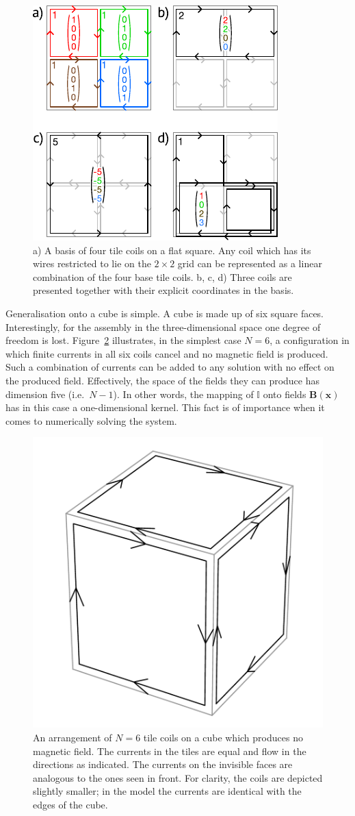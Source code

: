 \begin{figure}
  \centering
  \includegraphics[width=0.6\linewidth]{gfx/coils/tile_basis.pdf}
  \caption{a) A basis of four tile coils on a flat square. Any coil which has its wires restricted to lie on the $2 \times 2$ grid can be represented as a linear combination of the four base tile coils. b, c, d) Three coils are presented together with their explicit coordinates in the basis.}\label{fig:coils_tile_basis}
\end{figure}

Generalisation onto a cube is simple. A cube is made up of six square faces. Interestingly, for the assembly in the three-dimensional space one degree of freedom is lost.  Figure~\ref{fig:coils_tile_kernel} illustrates, in the simplest case $N = 6$, a configuration in which finite currents in all six coils cancel and no magnetic field is produced. Such a combination of currents can be added to any solution with no effect on the produced field. Effectively, the space of the fields they can produce has dimension five (i.e.\ $N-1$). In other words, the mapping of $\mathbb{I}$ onto fields $\mathbf{B}(\mathbf{x})$ has in this case a one-dimensional kernel. This fact is of importance when it comes to numerically solving the system.

\begin{figure}
  \centering
  \includegraphics[width=0.5\linewidth]{gfx/coils/tile_kernel2.pdf}
  \caption{An arrangement of $N = 6$ tile coils on a cube which produces no magnetic field. The currents in the tiles are equal and flow in the directions as indicated. The currents on the invisible faces are analogous to the ones seen in front. For clarity, the coils are depicted slightly smaller; in the model the currents are identical with the edges of the cube.}\label{fig:coils_tile_kernel}
\end{figure}

